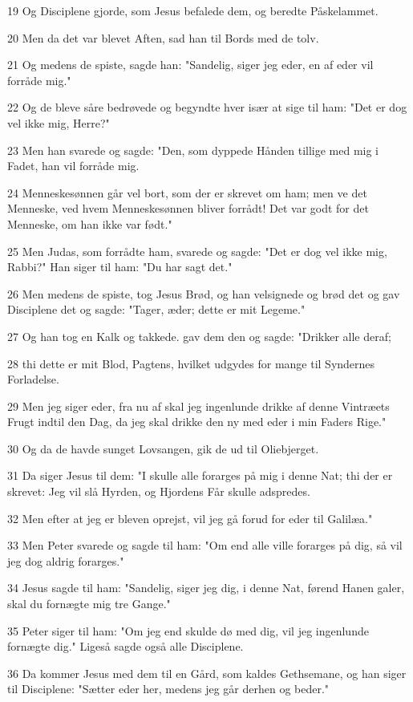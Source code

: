 \par 19 Og Disciplene gjorde, som Jesus befalede dem, og beredte Påskelammet.
\par 20 Men da det var blevet Aften, sad han til Bords med de tolv.
\par 21 Og medens de spiste, sagde han: "Sandelig, siger jeg eder, en af eder vil forråde mig."
\par 22 Og de bleve såre bedrøvede og begyndte hver især at sige til ham: "Det er dog vel ikke mig, Herre?"
\par 23 Men han svarede og sagde: "Den, som dyppede Hånden tillige med mig i Fadet, han vil forråde mig.
\par 24 Menneskesønnen går vel bort, som der er skrevet om ham; men ve det Menneske, ved hvem Menneskesønnen bliver forrådt! Det var godt for det Menneske, om han ikke var født."
\par 25 Men Judas, som forrådte ham, svarede og sagde: "Det er dog vel ikke mig, Rabbi?" Han siger til ham: "Du har sagt det."
\par 26 Men medens de spiste, tog Jesus Brød, og han velsignede og brød det og gav Disciplene det og sagde: "Tager, æder; dette er mit Legeme."
\par 27 Og han tog en Kalk og takkede. gav dem den og sagde: "Drikker alle deraf;
\par 28 thi dette er mit Blod, Pagtens, hvilket udgydes for mange til Syndernes Forladelse.
\par 29 Men jeg siger eder, fra nu af skal jeg ingenlunde drikke af denne Vintræets Frugt indtil den Dag, da jeg skal drikke den ny med eder i min Faders Rige."
\par 30 Og da de havde sunget Lovsangen, gik de ud til Oliebjerget.
\par 31 Da siger Jesus til dem: "I skulle alle forarges på mig i denne Nat; thi der er skrevet: Jeg vil slå Hyrden, og Hjordens Får skulle adspredes.
\par 32 Men efter at jeg er bleven oprejst, vil jeg gå forud for eder til Galilæa."
\par 33 Men Peter svarede og sagde til ham: "Om end alle ville forarges på dig, så vil jeg dog aldrig forarges."
\par 34 Jesus sagde til ham: "Sandelig, siger jeg dig, i denne Nat, førend Hanen galer, skal du fornægte mig tre Gange."
\par 35 Peter siger til ham: "Om jeg end skulde dø med dig, vil jeg ingenlunde fornægte dig." Ligeså sagde også alle Disciplene.
\par 36 Da kommer Jesus med dem til en Gård, som kaldes Gethsemane, og han siger til Disciplene: "Sætter eder her, medens jeg går derhen og beder."
